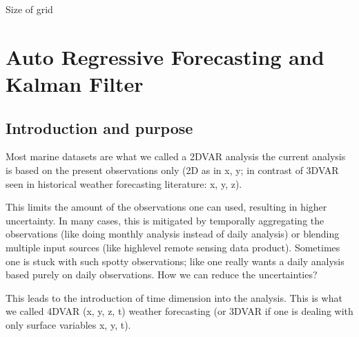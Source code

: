 \documentclass[letterpaper,10pt,english]{sphinxmanual}
\begin{document}
\begin{fulllineitems}
\begin{fulllineitems}
\end{fulllineitems}


\begin{fulllineitems}
\label{\detokenize{grid:glomar_gridding.grid.Grid.size}}
\pysigstartsignatures
\pysigline
{}
\pysigstopsignatures
\sphinxAtStartPar
Size of grid

\end{fulllineitems}


\end{fulllineitems}


\sphinxstepscope


\chapter{Auto Regressive Forecasting and Kalman Filter}
\label{\detokenize{kalman:auto-regressive-forecasting-and-kalman-filter}}\label{\detokenize{kalman::doc}}

\section{Introduction and purpose}
\label{\detokenize{kalman:introduction-and-purpose}}
\sphinxAtStartPar
Most marine datasets are what we called a 2DVAR analysis \sphinxhyphen{} the current analysis is based on the
present observations only (2D as in x, y; in contrast of 3DVAR seen in historical weather
forecasting literature: x, y, z).

\sphinxAtStartPar
This limits the amount of the observations one can used, resulting in higher uncertainty. In many
cases, this is mitigated by temporally aggregating the observations (like doing monthly analysis
instead of daily analysis) or blending multiple input sources (like high\sphinxhyphen{}level remote sensing data
product). Sometimes one is stuck with such spotty observations; like one really wants a daily
analysis based purely on daily observations. How we can reduce the uncertainties?

\sphinxAtStartPar
This leads to the introduction of time dimension into the analysis. This is what we called 4DVAR (x,
y, z, t) weather forecasting (or 3DVAR if one is dealing with only surface variables \sphinxhyphen{} x, y, t).
\end{document}
